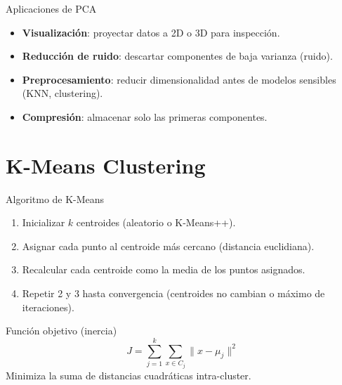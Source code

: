 \documentclass[aspectratio=169, 10pt, xcolor=table]{beamer}
\begin{document}
\begin{frame}{Aplicaciones de PCA}
    \begin{itemize}
        \item \textbf{Visualización}: proyectar datos a 2D o 3D para inspección.
        \item \textbf{Reducción de ruido}: descartar componentes de baja varianza (ruido).
        \item \textbf{Preprocesamiento}: reducir dimensionalidad antes de modelos sensibles (KNN, clustering).
        \item \textbf{Compresión}: almacenar solo las primeras componentes.
    \end{itemize}
\end{frame}

\section{K-Means Clustering}

\begin{frame}{Algoritmo de K-Means}
    \begin{enumerate}
        \item Inicializar $k$ centroides (aleatorio o K-Means++).
        \item Asignar cada punto al centroide más cercano (distancia euclidiana).
        \item Recalcular cada centroide como la media de los puntos asignados.
        \item Repetir 2 y 3 hasta convergencia (centroides no cambian o máximo de iteraciones).
    \end{enumerate}
    \vspace{0.3cm}
    \begin{block}{Función objetivo (inercia)}
        \[
        J = \sum_{j=1}^{k} \sum_{x \in C_j} \|x - \mu_j\|^2
        \]
        Minimiza la suma de distancias cuadráticas intra-cluster.
    \end{block}
\end{frame}
\end{document}
